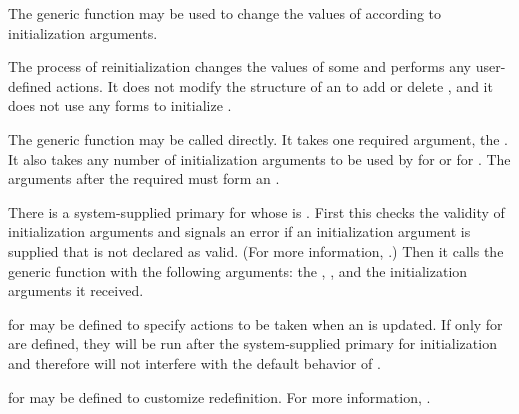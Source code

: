                       
The generic function  may be used to change
the values of  according to initialization arguments.

The process of reinitialization changes the values of some  and
performs any user-defined actions.  It does not modify the structure
of an  to add or delete , 
and it does not use any  forms to initialize .

The generic function  may be called
directly.  It takes one required argument, the .  It also
takes any number of initialization arguments to be used by  for
 or for . The
arguments after the required  must form an 
.
                                               
There is a system-supplied primary  for 
 whose  is 
.  First this  checks the validity of
initialization arguments and signals an error if an initialization
argument is supplied that is not declared as valid. 
(For more information, \seesection\DeclaringInitargValidity.)
Then it calls the generic function 
 with the following arguments: the ,
\nil, and the initialization arguments it received.


 for  may be defined to specify
actions to be taken when an  is updated.  If only
 for  are defined, 
they will be run after the system-supplied primary  for 
initialization and therefore will not interfere with the default behavior of 
.

 for  may be defined to customize 
 redefinition.  For more information, \seesection\SharedInitialize.

\endsubsection%

